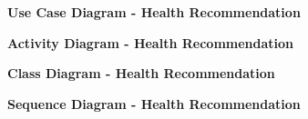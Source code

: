 \documentclass{article}
\begin{document}
		\begin{figure}[htbp]
			\textbf{Use Case Diagram - Health Recommendation}
			\centering
			\begin{subfigure}{\textwidth}
				\resizebox{\textwidth}{!}{}
			\end{subfigure}
			\begin{subfigure}{\textwidth}
				
			\end{subfigure}
		\end{figure}
		\clearpage
		

		\begin{figure}[htbp]
			\textbf{Activity Diagram - Health Recommendation}
			\centering
			\begin{subfigure}{\textwidth}
				\resizebox{\textwidth}{!}{}
			\end{subfigure}
			\begin{subfigure}{\textwidth}
				
			\end{subfigure}
		\end{figure}
		\clearpage
		
		\begin{figure}[htbp]
			\textbf{Class Diagram - Health Recommendation}
			\centering
			\begin{subfigure}{\textwidth}
				\resizebox{\textwidth}{!}{}
			\end{subfigure}
			\begin{subfigure}{\textwidth}
				
			\end{subfigure}
		\end{figure}
		\clearpage
		
		\begin{figure}[htbp]
			\textbf{Sequence Diagram - Health Recommendation}
			\centering
			\begin{subfigure}{\textwidth}
				\centering
				\scalebox{0.7}{}
			\end{subfigure}
			\begin{subfigure}{\textwidth}
				
			\end{subfigure}
		\end{figure}
		\clearpage
\end{document}
